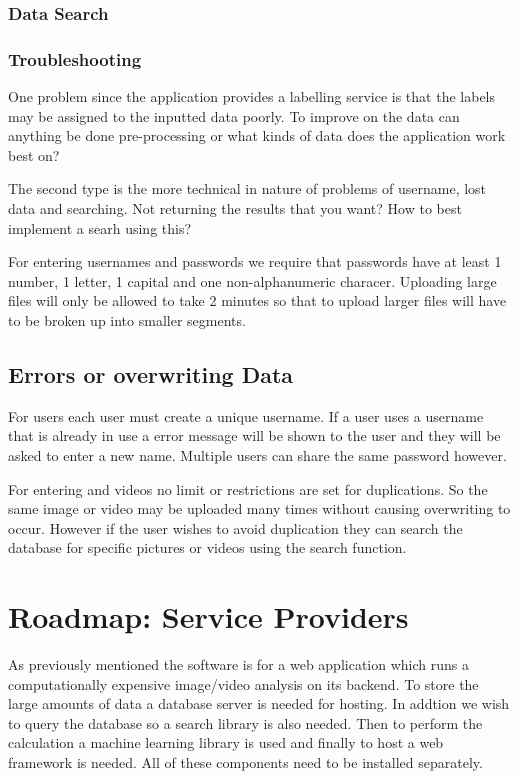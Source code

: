 \documentclass{scrreprt}
\begin{document}
\subsubsection{Data Search}



\subsubsection{Troubleshooting}
One problem since the application provides a labelling service is that the labels may be assigned to the inputted data poorly.  To improve on the data can anything be done pre-processing or what kinds of data does the application work best on?

The second type is the more technical in nature of problems of username, lost data and searching.  Not returning the results that you want? How  to best implement a searh using this?

For entering usernames and passwords we require that passwords have at least 1 number, 1 letter, 1 capital and one non-alphanumeric characer.  Uploading large files will only be allowed to take 2 minutes so that to upload larger files will have to be broken up into smaller segments.

\subsection{Errors or overwriting Data}

For users each user must create a unique username.  If a user uses a username that is already in use a error message will be shown to the user and they will be asked to enter a new name.  Multiple users can share the same password however.

For entering and videos no limit or restrictions are set for duplications.  So the same image or video may be uploaded many times without causing overwriting to occur.  However if the user wishes to avoid duplication they can search the database for specific pictures or videos using the search function.

\section{Roadmap: Service Providers}

As previously mentioned the software is for a  web application which runs a computationally expensive image/video analysis on its backend. To store the large amounts of data a database server is needed for hosting.  In addtion we wish to query the database so a search library is also needed. Then to perform the calculation a machine learning library is used and finally to host a web framework is needed. All of these components need to be installed separately.
\end{document}

